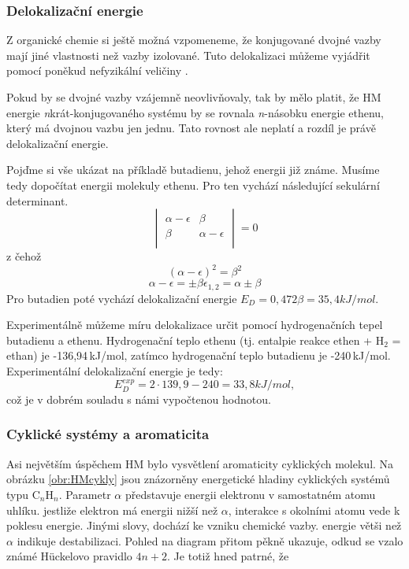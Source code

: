 \subsubsection{Delokalizační energie}

Z organické chemie si ještě možná vzpomeneme, že konjugované dvojné vazby mají jiné vlastnosti než vazby izolované.
Tuto delokalizaci můžeme vyjádřit pomocí poněkud nefyzikální veličiny .

Pokud by se dvojné vazby vzájemně neovlivňovaly, tak by mělo platit, že HM energie
\textit{n}krát-konjugovaného systému by se rovnala \textit{n}-násobku energie ethenu, který má dvojnou vazbu jen jednu. Tato rovnost ale neplatí a rozdíl je právě delokalizační energie. 

Pojďme si vše ukázat na příkladě butadienu, jehož energii již známe. Musíme tedy dopočítat energii molekuly ethenu. Pro ten vychází následující sekulární determinant. 
\begin{equation}
\begin{vmatrix}
\alpha - \epsilon & \beta \\
\beta & \alpha - \epsilon \\
\end{vmatrix}
=0
\end{equation}
z čehož
$$
(\alpha-\epsilon)^2=\beta^2
$$
$$
\alpha - \epsilon = \pm \beta
\epsilon_{1,2}= \alpha\pm \beta
$$
Pro butadien poté vychází delokalizační energie $E_D=0,472\beta=35,4 kJ/mol$.


Experimentálně můžeme míru delokalizace určit pomocí hydrogenačních tepel butadienu a ethenu.
Hydrogenační teplo ethenu (tj. entalpie reakce ethen + H$_2$ = ethan) je -136,94\,kJ/mol, zatímco hydrogenační teplo butadienu je -240\,kJ/mol. Experimentální delokalizační energie je tedy:
$$
E_D^{exp}=2\cdot139,9-240 = 33,8 kJ/mol,
$$
což je v dobrém souladu s námi vypočtenou hodnotou.

\subsubsection{Cyklické systémy a aromaticita}

Asi největším úspěchem HM bylo vysvětlení aromaticity cyklických molekul. Na obrázku \ref{obr:HMcykly} jsou znázorněny energetické hladiny cyklických systémů typu C$_n$H$_n$. Parametr $\alpha$ představuje energii elektronu v samostatném atomu uhlíku. jestliže elektron má energii nižší než  $\alpha$, interakce s okolními atomu vede k poklesu energie. Jinými slovy, dochází ke vzniku chemické vazby. energie větši než $\alpha$ indikuje destabilizaci. Pohled na diagram přitom pěkně ukazuje, odkud se vzalo známé  H\"{u}ckelovo pravidlo $4n+2$. Je totiž hned patrné, že

